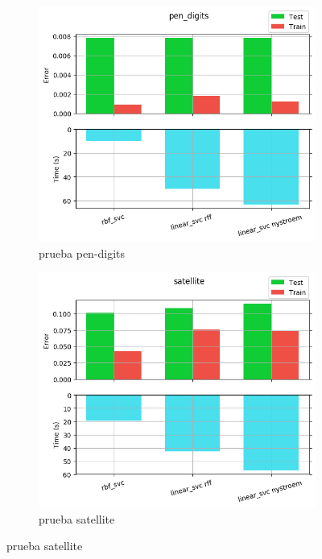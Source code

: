 \begin{figure}[ht]
  \centering
  \begin{subfigure}[b]{0.5\linewidth}
    \centering\includegraphics[width=\imgscale\linewidth]{Figures/1_1/pen_digits}
    \caption{prueba pen-digits}
    \label{fig:1_1_pen_digits}
  \end{subfigure}%
  \begin{subfigure}[b]{0.5\linewidth}
    \centering\includegraphics[width=\imgscale\linewidth]{Figures/1_1/satellite}
    \caption{prueba satellite}
    \label{fig:1_1_satellite}
  \end{subfigure}
\end{figure}


